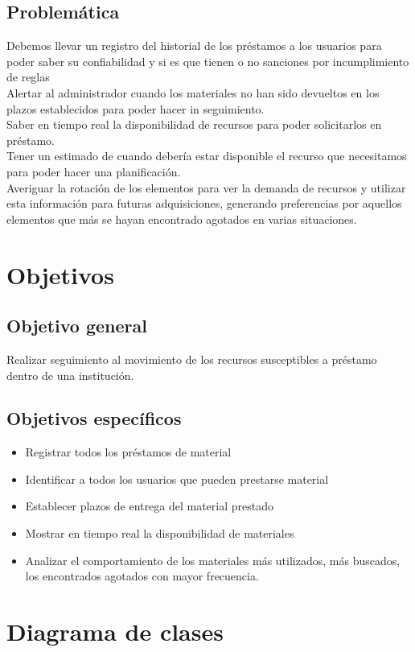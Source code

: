 \documentclass[12pt]{article}
\begin{document}
\subsection{Problemática}
Debemos llevar un registro del historial de los préstamos a los usuarios para poder saber su confiabilidad y si es que tienen o no sanciones por incumplimiento de reglas \\
Alertar al administrador cuando los materiales no han sido devueltos en los plazos establecidos para poder hacer in seguimiento. \\
Saber en tiempo real la disponibilidad de recursos para poder solicitarlos en préstamo.  \\
Tener un estimado de cuando debería estar disponible el recurso que necesitamos para poder hacer una planificación. \\
Averiguar la rotación de los elementos para ver la demanda de recursos  y utilizar esta información para futuras adquisiciones, generando preferencias por aquellos elementos que más se hayan encontrado agotados en varias situaciones. 

\section{Objetivos}
\subsection{Objetivo general}
Realizar seguimiento al movimiento de los recursos susceptibles a préstamo dentro de una institución.  
\subsection{Objetivos específicos}
\begin{itemize}
\item Registrar todos los préstamos de material
\item Identificar a todos los usuarios que pueden prestarse material
\item Establecer plazos de entrega del material prestado
\item Mostrar en tiempo real la disponibilidad de materiales
\item Analizar el comportamiento de los materiales más utilizados, más buscados, los encontrados agotados con mayor frecuencia.  

\end{itemize}

\section{Diagrama de clases}
\end{document}
